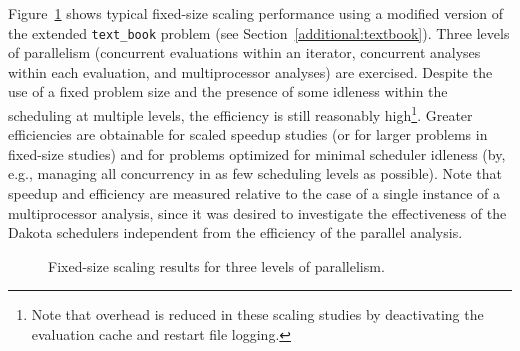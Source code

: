 Figure~\ref{fig:mlp_scaling} shows typical fixed-size scaling
performance using a modified version of the extended
\texttt{text\_book} problem (see Section~\ref{additional:textbook}).
Three levels of parallelism (concurrent evaluations within an
iterator, concurrent analyses within each evaluation, and
multiprocessor analyses) are exercised.  Despite the use of a fixed
problem size and the presence of some idleness within the scheduling
at multiple levels, the efficiency is still reasonably
high\footnote{Note that overhead is reduced in these scaling studies
by deactivating the evaluation cache and restart file logging.}.
Greater efficiencies are obtainable for scaled speedup studies (or for
larger problems in fixed-size studies) and for problems optimized for
minimal scheduler idleness (by, e.g., managing all concurrency in as
few scheduling levels as possible).  Note that speedup and efficiency
are measured relative to the case of a single instance of a
multiprocessor analysis, since it was desired to investigate the
effectiveness of the Dakota schedulers independent from the efficiency
of the parallel analysis.
\begin{figure}[ht]
  \centering
  \caption{Fixed-size scaling results for three levels of parallelism.}
  \label{fig:mlp_scaling}
\end{figure}

